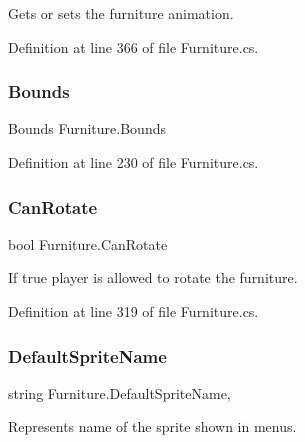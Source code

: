 Gets or sets the furniture animation. 



Definition at line 366 of file Furniture.\+cs.

\mbox{\label{class_furniture_a496d1f87bc89564b45ef182166eebc8d}} 
\subsubsection{\texorpdfstring{Bounds}{Bounds}}
{\footnotesize\ttfamily Bounds Furniture.\+Bounds\hspace{0.3cm}{\ttfamily [get]}}



Definition at line 230 of file Furniture.\+cs.

\mbox{\label{class_furniture_a48015edd488d45e215e358638d088939}} 
\subsubsection{\texorpdfstring{Can\+Rotate}{CanRotate}}
{\footnotesize\ttfamily bool Furniture.\+Can\+Rotate\hspace{0.3cm}{\ttfamily [get]}}



If true player is allowed to rotate the furniture. 



Definition at line 319 of file Furniture.\+cs.

\mbox{\label{class_furniture_acf7ad5c7362463b38594605407d0d189}} 
\subsubsection{\texorpdfstring{Default\+Sprite\+Name}{DefaultSpriteName}}
{\footnotesize\ttfamily string Furniture.\+Default\+Sprite\+Name\hspace{0.3cm}{\ttfamily [get]}, {\ttfamily [set]}}



Represents name of the sprite shown in menus. 



